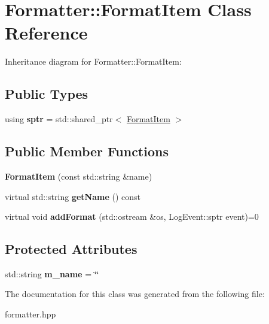 \hypertarget{classFormatter_1_1FormatItem}{}\section{Formatter\+:\+:Format\+Item Class Reference}
\label{classFormatter_1_1FormatItem}


Inheritance diagram for Formatter\+:\+:Format\+Item\+:
\subsection*{Public Types}
\begin{DoxyCompactItemize}
\item 
\mbox{\label{classFormatter_1_1FormatItem_a2a8db56923ab1a9974d6553a793c4721}} 
using {\bfseries sptr} = std\+::shared\+\_\+ptr$<$ \hyperlink{classFormatter_1_1FormatItem}{Format\+Item} $>$
\end{DoxyCompactItemize}
\subsection*{Public Member Functions}
\begin{DoxyCompactItemize}
\item 
\mbox{\label{classFormatter_1_1FormatItem_a08cc2ba05c0ef25e947d9761616f082a}} 
{\bfseries Format\+Item} (const std\+::string \&name)
\item 
\mbox{\label{classFormatter_1_1FormatItem_a47ed2a4f3abb9a1123b11196bed8d22b}} 
virtual std\+::string {\bfseries get\+Name} () const
\item 
\mbox{\label{classFormatter_1_1FormatItem_ad698c93c5327ff2825ae7ed66fe7c210}} 
virtual void {\bfseries add\+Format} (std\+::ostream \&os, Log\+Event\+::sptr event)=0
\end{DoxyCompactItemize}
\subsection*{Protected Attributes}
\begin{DoxyCompactItemize}
\item 
\mbox{\label{classFormatter_1_1FormatItem_a70517d7119cc4a4ed0191288bba7bb22}} 
std\+::string {\bfseries m\+\_\+name} = \char`\"{}\char`\"{}
\end{DoxyCompactItemize}


The documentation for this class was generated from the following file\+:\begin{DoxyCompactItemize}
\item 
formatter.\+hpp\end{DoxyCompactItemize}
